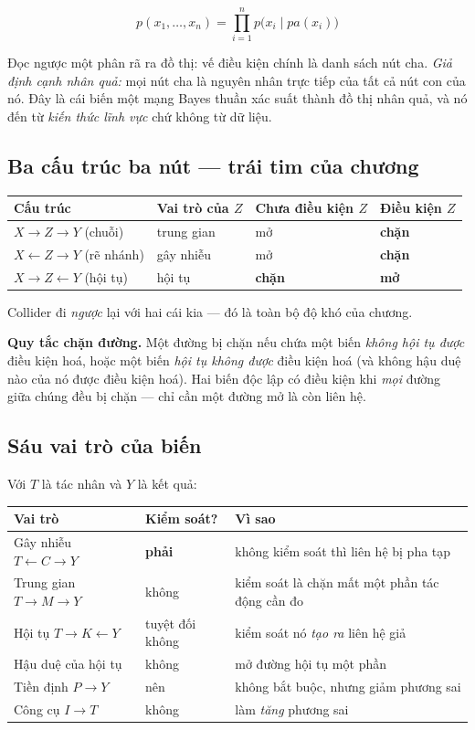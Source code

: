 \documentclass[11pt]{article}
\begin{document}
\[
p(x_1,\dots,x_n) = \prod_{i=1}^{n} p\bigl(x_i \mid pa(x_i)\bigr)
\]

Đọc ngược một phân rã ra đồ thị: vế điều kiện chính là danh sách nút cha.
\emph{Giả định cạnh nhân quả:} mọi nút cha là nguyên nhân trực tiếp của tất cả nút
con của nó. Đây là cái biến một mạng Bayes thuần xác suất thành đồ thị nhân quả,
và nó đến từ \emph{kiến thức lĩnh vực} chứ không từ dữ liệu.

\subsection*{Ba cấu trúc ba nút --- trái tim của chương}

\begin{center}
\begin{tabular}{@{}llll@{}}
\toprule
\textbf{Cấu trúc} & \textbf{Vai trò của $Z$} & \textbf{Chưa điều kiện $Z$} & \textbf{Điều kiện $Z$} \\
\midrule
$X \to Z \to Y$ (chuỗi) & trung gian & mở & \textbf{chặn} \\
$X \leftarrow Z \to Y$ (rẽ nhánh) & gây nhiễu & mở & \textbf{chặn} \\
$X \to Z \leftarrow Y$ (hội tụ) & hội tụ & \textbf{chặn} & \textbf{mở} \\
\bottomrule
\end{tabular}
\end{center}

Collider đi \emph{ngược} lại với hai cái kia --- đó là toàn bộ độ khó của chương.

\textbf{Quy tắc chặn đường.} Một đường bị chặn nếu chứa một biến \emph{không hội
tụ được} điều kiện hoá, hoặc một biến \emph{hội tụ không được} điều kiện hoá (và
không hậu duệ nào của nó được điều kiện hoá). Hai biến độc lập có điều kiện khi
\emph{mọi} đường giữa chúng đều bị chặn --- chỉ cần một đường mở là còn liên hệ.

\subsection*{Sáu vai trò của biến}

Với $T$ là tác nhân và $Y$ là kết quả:

\begin{center}
\begin{tabular}{@{}llp{7.2cm}@{}}
\toprule
\textbf{Vai trò} & \textbf{Kiểm soát?} & \textbf{Vì sao} \\
\midrule
Gây nhiễu $T \leftarrow C \to Y$ & \textbf{phải} & không kiểm soát thì liên hệ bị pha tạp \\
Trung gian $T \to M \to Y$ & không & kiểm soát là chặn mất một phần tác động cần đo \\
Hội tụ $T \to K \leftarrow Y$ & tuyệt đối không & kiểm soát nó \emph{tạo ra} liên hệ giả \\
Hậu duệ của hội tụ & không & mở đường hội tụ một phần \\
Tiền định $P \to Y$ & nên & không bắt buộc, nhưng giảm phương sai \\
Công cụ $I \to T$ & không & làm \emph{tăng} phương sai \\
\bottomrule
\end{tabular}
\end{center}
\end{document}

